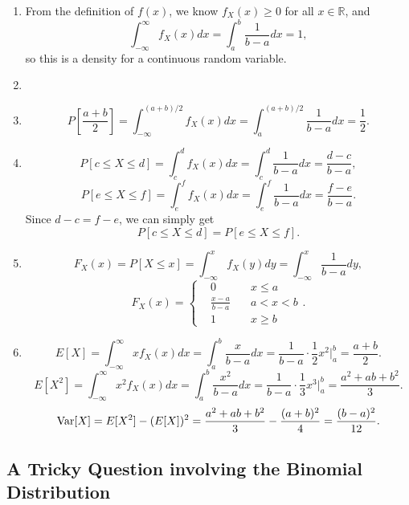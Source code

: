 \documentclass[11pt,a4paper]{article}
\begin{document}
\begin{enumerate}[label=\roman*)]
\item
From the definition of $f(x)$, we know $f_X(x)\geqslant0$ for all $x\in\mathbb{R}$, and
$$\int_{-\infty}^\infty f_X(x)dx=\int_a^b\frac{1}{b-a}dx=1,$$
so this is a density for a continuous random variable.
\item~
\begin{center}
\end{center}
\item
$$P\left[\frac{a+b}{2}\right]=\int_{-\infty}^{(a+b)/2}f_X(x)dx=\int_a^{(a+b)/2}\frac{1}{b-a}dx=\frac{1}{2}.$$
\item
$$P[c\leqslant X\leqslant d]=\int_c^df_X(x)dx=\int_c^d\frac{1}{b-a}dx=\frac{d-c}{b-a},$$
$$P[e\leqslant X\leqslant f]=\int_e^ff_X(x)dx=\int_e^f\frac{1}{b-a}dx=\frac{f-e}{b-a}.$$
Since $d-c=f-e$, we can simply get
$$P[c\leqslant X\leqslant d]=P[e\leqslant X\leqslant f].$$
\item
$$F_X(x)=P[X\leqslant x]=\int_{-\infty}^xf_X(y)dy=\int_{-\infty}^x\frac{1}{b-a}dy,$$
$$F_X(x)=\left\{\begin{aligned}
&0&\quad x\leqslant a\\
&\frac{x-a}{b-a}&\quad a<x<b\\
&1&\quad x\geqslant b
\end{aligned}\right..$$
\item
$$E[X]=\int_{-\infty}^\infty xf_X(x)dx=\int_a^b\frac{x}{b-a}dx=\frac{1}{b-a}\cdot\frac{1}{2}x^2\bigg|_a^b=\frac{a+b}{2}.$$
$$E[X^2]=\int_{-\infty}^\infty x^2f_X(x)dx=\int_a^b\frac{x^2}{b-a}dx=\frac{1}{b-a}\cdot\frac{1}{3}x^3\bigg|_a^b=\frac{a^2+ab+b^2}{3}.$$
$${\rm Var}[X]=E[X^2]-(E[X])^2=\frac{a^2+ab+b^2}{3}-\frac{(a+b)^2}{4}=\frac{(b-a)^2}{12}.$$
\end{enumerate}

\subsection{A Tricky Question involving the Binomial Distribution}
\end{document}
